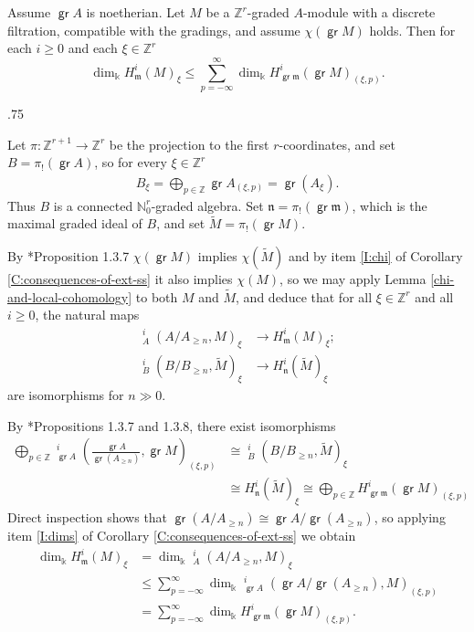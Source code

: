 \documentclass[11pt,fleqn]{article}
\makeatletter
\renewenvironment{proof}[1][\textit{Proof}]{\par
  \pushQED{\qed}%
  \normalfont \topsep.75\paraskip\relax
  \trivlist
  \item[\hskip\labelsep
        \itshape
    #1\@addpunct{.}]\ignorespaces
}{%
  \popQED\endtrivlist\@endpefalse
}
\newcommand\NN{\mathbb N}
\newcommand\ZZ{\mathbb Z}
\renewcommand\to{\longrightarrow}
\renewcommand\k{\Bbbk}
\newcommand\m{\mathfrak m}
\newcommand\n{\mathfrak n}
\DeclareMathOperator\GrExt{\underline{\mathsf{Ext}}}
\DeclareMathOperator\gr{\mathsf{gr}}
\makeatother
\begin{document}
\begin{Corollary*}
Assume $\gr A$ is noetherian. Let $M$ be a $\ZZ^r$-graded $A$-module with a discrete 
filtration, compatible with the gradings, and assume $\chi(\gr M)$ holds. Then for each 
$i \geq 0$ and each $\xi \in \ZZ^r$ 
  \[
    \dim_\k H^i_\m(M)_\xi \leq \sum_{p=- \infty}^\infty \dim_\k H^i_{\gr \m}(\gr
    M)_{(\xi, p)}.
  \]
\end{Corollary*}
\begin{proof}
Let $\pi: \ZZ^{r+1} \to \ZZ^r$ be the projection to the first $r$-coordinates, and set $B
= \pi_!(\gr A)$, so for every $\xi \in \ZZ^r$
\begin{align*}
B_\xi = \bigoplus_{p \in \ZZ} \gr A_{(\xi, p)} = \gr (A_\xi).
\end{align*}
Thus $B$ is a connected $\NN_0^r$-graded algebra. Set $\n = \pi_!(\gr \m)$, which is
the maximal graded ideal of $B$, and set $\tilde M = \pi_!(\gr M)$.

By \cite{RZ2}*{Proposition 1.3.7} $\chi(\gr M)$ implies
$\chi(\tilde M)$ and by item \ref{I:chi} of Corollary \ref{C:consequences-of-ext-ss} it 
also implies $\chi(M)$, so we may apply Lemma \ref{chi-and-local-cohomology} to both $M$ 
and $\tilde M$, and deduce that for all $\xi \in \ZZ^r$ and all $i \geq 0$, the natural maps 
\begin{align*}
  \GrExt^i_A(A/A_{\geq n}, M)_\xi &\to H^i_\m(M)_\xi;\\
  \GrExt^i_B(B/B_{\geq n}, \tilde M)_\xi &\to H^i_\n( \tilde M)_\xi
\end{align*}
are isomorphisms for $n \gg 0$.

By \cite{RZ2}*{Propositions 1.3.7 and 1.3.8}, there exist isomorphisms
\begin{align*}
\bigoplus_{p \in \ZZ} \GrExt^i_{\gr A}\left(\frac{\gr A}{\gr (A_{\geq n})}, \gr M 
  \right)_{(\xi, p)} 
  &\cong \GrExt^i_B \left(B/B_{\geq n}, \tilde M \right)_\xi  \\
  &\cong H^i_\n(\tilde M)_\xi 
  \cong \bigoplus_{p \in \ZZ} H^i_{\gr \m}(\gr M)_{(\xi, p)} 
\end{align*}
Direct inspection shows that $\gr(A/A_{\geq n}) \cong \gr A / \gr (A_{\geq n})$, so 
applying item \ref{I:dims} of Corollary \ref{C:consequences-of-ext-ss} we obtain
\begin{align*}
\dim_\k H^i_\m(M)_\xi 
  &= \dim_\k \GrExt^i_A(A/A_{\geq n}, M)_\xi \\
  &\leq \sum_{p = -\infty}^\infty \dim_\k
  \GrExt^i_{\gr A}(\gr A / \gr (A_{\geq n}), M)_{(\xi, p)} \\
  &= \sum_{p = -\infty}^\infty \dim_\k H^i_{\gr \m}(\gr M)_{(\xi, p)}.
\end{align*}
\end{proof}
\end{document}
